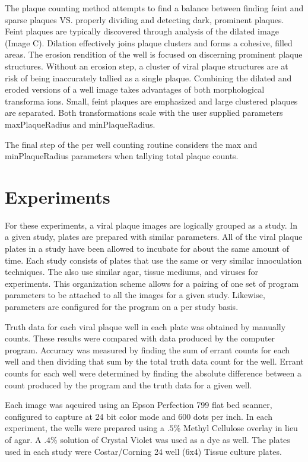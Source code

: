 \documentclass[11pt,final,twocolumn]{IEEEtran}
\begin{document}
The plaque counting method attempts to find a balance between finding feint and sparse plaques VS. properly dividing and detecting dark, prominent plaques. Feint  plaques are typically discovered through analysis of the dilated image (Image C). Dilation effectively joins plaque clusters and forms a cohesive, filled areas. The erosion rendition of the well is focused on discerning prominent plaque structures.  Without an erosion step, a cluster of viral plaque structures are at risk of being inaccurately tallied as a single plaque. Combining the dilated and eroded versions of a well image takes advantages of both morphological transforma ions. Small, feint plaques are emphasized and large  clustered plaques are separated. Both transformations scale with the user supplied parameters maxPlaqueRadius and minPlaqueRadius.

The final step of the per well counting routine considers the max and minPlaqueRadius parameters when tallying total plaque counts. 

\section{Experiments}

For these experiments, a viral plaque images are logically grouped as a study. In a given study, plates are prepared with similar parameters. All of the viral plaque plates in a study have been allowed to incubate for about the same amount of time. Each study consists of plates that use the same or very similar innoculation techniques. The also use similar agar, tissue mediums, and viruses for experiments. This organization scheme allows for a pairing of one set of program parameters to be attached to all the images for a given study. Likewise, parameters are configured for the program on a per study 
basis.

Truth data for each viral plaque well in each plate was obtained by manually counts. These results were compared with data produced by the computer program. Accuracy was measured by finding the sum of errant counts for each well and then dividing that sum by the total truth data count for the well. Errant counts for each well were determined by finding the absolute difference between a count produced by the program and the truth data for a given well.

Each image was aqcuired using an Epson Perfection 799 flat bed scanner, configured to capture at 24 bit color mode and 600 dots per inch. In each experiment, the wells were prepared using a $.5$\%   Methyl Cellulose overlay in lieu of agar. A $.4$\% solution of Crystal Violet was used as a dye as well. 
The plates used in each study were Costar/Corning 24 well (6x4) Tissue culture plates. 
\end{document}

